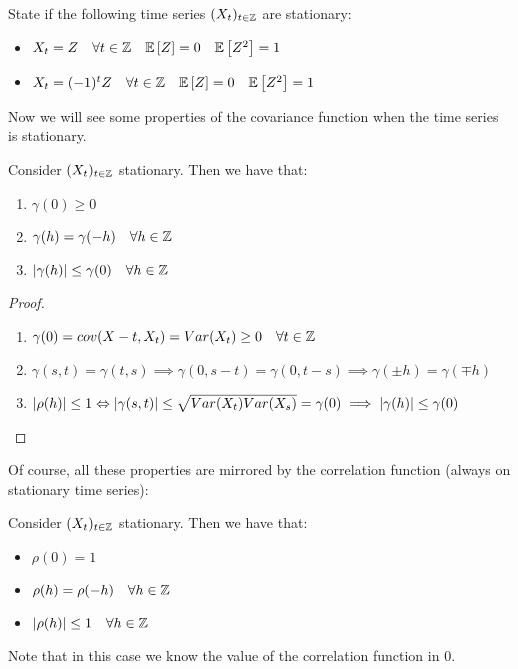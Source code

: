 \begin{exercise}
    State if the following time series $(X_t)_{t\in\mathbb{Z}}$ are stationary:
    \begin{itemize}
        \item $X_t=Z\ \ \ \forall t\in\Z\ \ \ \expect{Z}=0\ \ \ \expect{Z^2}=1$
        \item $X_t=(-1)^tZ\ \ \ \forall t\in\Z\ \ \ \expect{Z}=0\ \ \ \expect{Z^2}=1$
    \end{itemize}
\end{exercise}

Now we will see some properties of the covariance function when the time series is stationary.
\begin{theorem}
    Consider $(X_t)_{t\in\mathbb{Z}}$ stationary. Then we have that:
    \begin{enumerate}
        \item $\gamma(0)\ge0$
        \item $\gamma(h)=\gamma(-h)\ \ \ \forall h\in\mathbb{Z}$
        \item $\abs{\gamma(h)}\le\gamma(0)\ \ \ \forall h\in\Z$
    \end{enumerate}
\end{theorem}
\begin{proof}
    \text{}
    \begin{enumerate}
        \item $\gamma(0)=cov(X-t,X_t)=Var(X_t)\ge0\ \ \ \forall t\in\Z$
        \item $\gamma(s,t)=\gamma(t,s) \implies \gamma(0,s-t)=\gamma(0,t-s) \implies \gamma(\pm h)=\gamma(\mp h)$
        \item $\left|\rho(h)\right|\le1 \Leftrightarrow \left|\gamma(s,t)\right|\le\sqrt{Var(X_t)Var(X_s)}=\gamma(0) \implies \left|\gamma(h)\right|\le\gamma(0)$
    \end{enumerate}
\end{proof}

Of course, all these properties are mirrored by the correlation function (always on stationary time series):

\begin{corollary}
    Consider $(X_t)_{t\in\mathbb{Z}}$ stationary. Then we have that:
    \begin{itemize}
        \item $\rho(0)=1$
        \item $\rho(h)=\rho(-h)\ \ \ \forall h\in\mathbb{Z}$
        \item $\left|\rho(h)\right|\le1\ \ \ \forall h\in\mathbb{Z}$
    \end{itemize}
    Note that in this case we know the value of the correlation function in 0.
\end{corollary}

